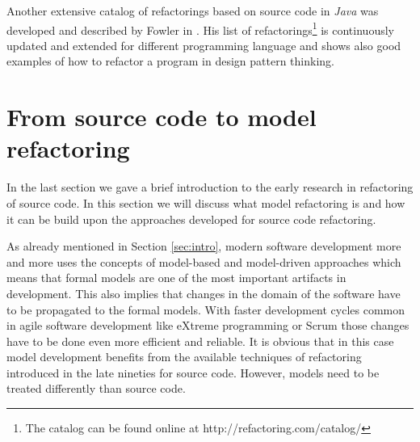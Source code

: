 \documentclass{llncs}
\begin{document}
Another extensive catalog of refactorings based on source code in \textit{Java} was developed and
described by Fowler in \cite{fow99}. His list of refactorings\footnote{The catalog can be found online at
http://refactoring.com/catalog/} is continuously updated and extended for different programming language and shows also
good examples of how to refactor a program in design pattern thinking.

\section{From source code to model refactoring}
\label{sec:fromto}

In the last section we gave a brief introduction to the early research in refactoring of source code. In this section we will discuss
what model refactoring is and how it can be build upon the approaches developed for source code refactoring. 

As already mentioned in Section
\ref{sec:intro}, modern software development more and more uses the concepts of model-based and model-driven approaches
which means that formal models are one of the most important artifacts in development. This also implies that changes in
the domain of the software have to be propagated to the formal models. With faster development cycles common in agile
software development like eXtreme programming \cite{DBLP:journals/computer/Beck99} or Scrum
\cite{DBLP:journals/software/RisingJ00} those changes have to be done even more efficient and reliable. It is obvious
that in this case model development benefits from the available techniques of refactoring introduced in the late nineties for
source code. However, models need to be treated differently than source code.
\end{document}
